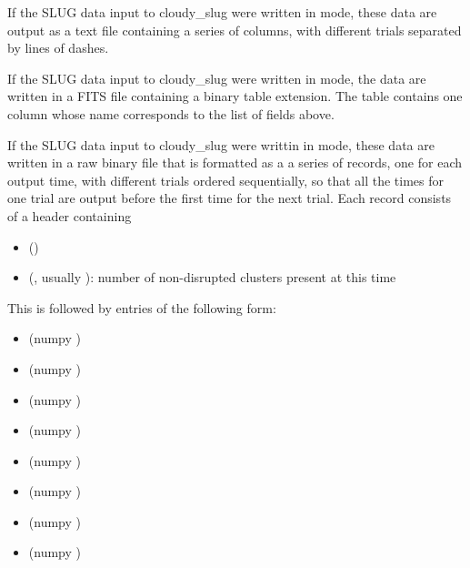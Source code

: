 \documentclass[letterpaper,10pt,english]{sphinxmanual}
\begin{document}
If the SLUG data input to cloudy\_slug were written in  mode,
these data are output as a text file containing a series of columns,
with different trials separated by lines of dashes.

If the SLUG data input to cloudy\_slug were written in  mode,
the data are written in a FITS file containing a binary table
extension. The table contains one column whose name corresponds to the
list of fields above.

If the SLUG data input to cloudy\_slug were writtin in  mode,
these data are written in a raw binary file that is formatted as a
a series of records, one for each output time, with different trials
ordered sequentially, so that all the times for one trial are output
before the first time for the next trial. Each record consists of a
header containing
\begin{itemize}
\item {} 
 ()

\item {} 
 (, usually ): number of non-disrupted clusters present at this time

\end{itemize}

This is followed by  entries of the following form:
\begin{itemize}
\item {} 
 (numpy )

\item {} 
 (numpy )

\item {} 
 (numpy )

\item {} 
 (numpy )

\item {} 
 (numpy )

\item {} 
 (numpy )

\item {} 
 (numpy )

\item {} 
 (numpy )

\end{itemize}
\end{document}
